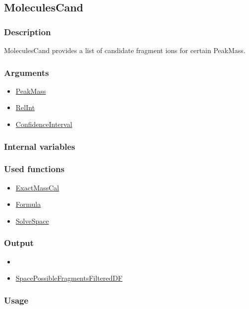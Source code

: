 \subsection{MoleculesCand}\label{MoleculesCand}
\subsubsection{Description}
MoleculesCand provides a list of candidate fragment ions for certain PeakMass.
\subsubsection{Arguments}
\begin{itemize}
\item \hyperref[PeakMass]{PeakMass}
\item \hyperref[RelInt]{RelInt}
\item \hyperref[ConfidenceInterval]{ConfidenceInterval}
\end{itemize}
\subsubsection{Internal variables}
\subsubsection{Used functions}
\begin{itemize}
\item \hyperref[ExactMassCal]{ExactMassCal}
\item \hyperref[Formula]{Formula}
\item \hyperref[SolveSpace]{SolveSpace}
\end{itemize}
\subsubsection{Output}
\begin{itemize}
\item \item \hyperref[SpacePossibleFragmentsFilteredDF]{SpacePossibleFragmentsFilteredDF}
\end{itemize}
\subsubsection{Usage}

